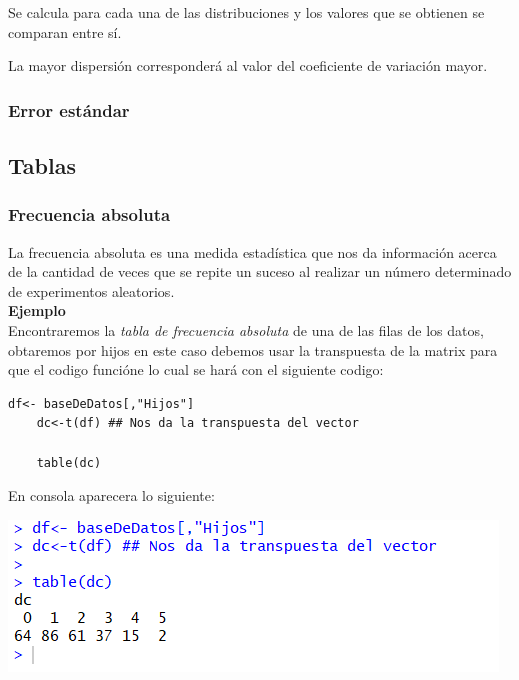 \documentclass[12pt,hidelinks]{article}
\begin{document}
	Se calcula para cada una de las distribuciones y los valores que se obtienen se comparan entre sí.
	
	La mayor dispersión corresponderá al valor del coeficiente de variación mayor.
	
	\subsubsection{Error estándar}
	\subsection{Tablas}
	\subsubsection{Frecuencia absoluta}
	La frecuencia absoluta es una medida estadística que nos da información acerca de la cantidad de veces que se repite un suceso al realizar un número determinado de experimentos aleatorios.\\
	\textbf{Ejemplo}\\
	\vspace{2mm}
	Encontraremos la \textit{tabla de frecuencia absoluta} de una de las filas de los datos, obtaremos por hijos  en este caso debemos usar la transpuesta de la matrix para que el codigo funcióne lo cual se hará con el siguiente codigo:
	\begin{lstlisting}[frame=single]
	df<- baseDeDatos[,"Hijos"]
	dc<-t(df) ## Nos da la transpuesta del vector
	
	table(dc)
	\end{lstlisting}
	En consola aparecera lo siguiente:
	\begin{center}
		\includegraphics[width = \linewidth]{TFabsoluta.PNG}
	\end{center}
\end{document}
